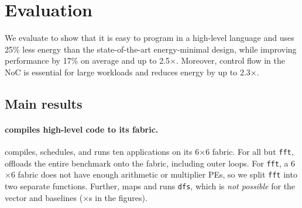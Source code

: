 \section{Evaluation}
\label{riptide:eval}

\figRipTideEnergyResults

\figRipTidePerformanceResults

We evaluate \riptide to show that it is easy to program in a high-level language
and uses 25\% less energy than the state-of-the-art energy-minimal design,
while improving performance by 17\% on average and up to 2.5$\times$.
Moreover, control flow in the NoC is essential for large
workloads and reduces energy by up to 2.3$\times$. %


\subsection{Main results}

\paragraph{\riptide compiles high-level code to its fabric.} \riptide
compiles, schedules, and runs ten applications on its 6$\times$6 fabric.
% 
For all but {\tt fft}, \riptide offloads the entire benchmark onto the fabric, including
outer loops.
% 
For {\tt fft}, a 6$\times$6 fabric does not have enough arithmetic or multiplier PEs,
so we split {\tt fft} into two separate functions. %
% 
Further, \riptide maps and runs {\tt dfs}, which is {\em not possible} for
the vector and \snafu baselines ($\times$s in the figures).

